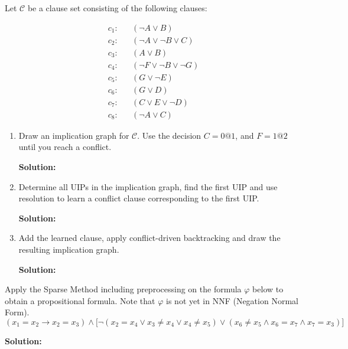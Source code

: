 \documentclass[11pt,a4paper]{uebung}
\newcommand{\solution}[1]{\par {\bf Solution:}\\#1}
\begin{document}
\newpage



Let $\mathcal{C}$ be a clause set consisting of the following clauses:

\begin{eqnarray*}
  c_1 \colon &&( \neg A \lor B )\\
  c_2\colon &&( \neg A \lor \neg B \lor C )\\
  c_3\colon &&( A \lor B )\\
  c_4\colon &&( \neg F \lor \neg B \lor \neg G )\\
  c_5\colon &&( G \lor \neg E )\\
  c_6\colon &&( G \lor D )\\
  c_7\colon &&( C \lor E \lor \neg D )\\
  c_8\colon &&( \neg A \lor C )
\end{eqnarray*}

\begin{enumerate}
\item Draw an implication graph for $\mathcal{C}$. Use the decision $C=0@1$,
  and $F=1@2$ until you reach a conflict.


\solution{

}

\item Determine all UIPs in the implication graph, find the first UIP and use
  resolution to learn a conflict clause corresponding to the first UIP.

\solution{

}

\item Add the learned clause, apply conflict-driven backtracking and draw the
  resulting implication graph.

\solution{

}
\end{enumerate}


Apply the Sparse Method including preprocessing on the formula $\varphi$
below to obtain a propositional formula. Note that $\varphi$ is not yet in NNF
(Negation Normal Form).
\begin{displaymath}
  (x_1 = x_2 \rightarrow x_2=x_3) \land
  \big[ \neg (x_2 = x_4 \lor x_3 \neq x_4
  \lor x_4 \neq x_5)
  \lor (x_6 \neq x_5 \land x_6=x_7 \land x_7=x_3)\big]
\end{displaymath}

\solution{

}
\end{document}
